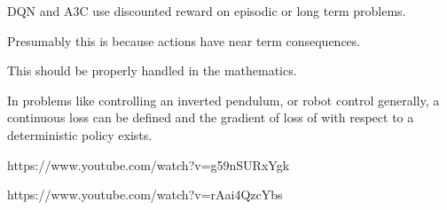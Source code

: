{DQN and A3C use discounted reward on episodic or long term problems.

\vfill
Presumably this is because actions have near term consequences.

\vfill
This should be properly handled in the mathematics.


In problems like controlling an inverted pendulum, or robot control generally,
a continuous loss can be defined and the gradient of loss of with respect to a deterministic policy exists.


https://www.youtube.com/watch?v=g59nSURxYgk

https://www.youtube.com/watch?v=rAai4QzcYbs




}



